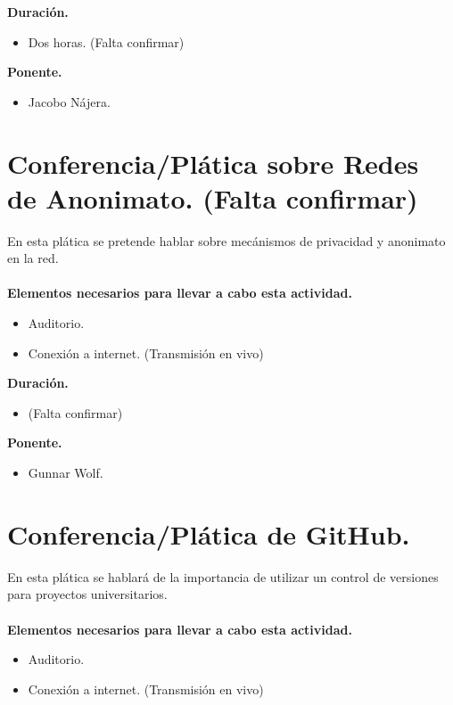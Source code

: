 \documentclass[a4paper,11pt]{article}                 %
\begin{document}
  \textbf{Duración.}
  \begin{itemize}
    \item Dos horas. (Falta confirmar)
  \end{itemize}
  
    \textbf{Ponente.}
  \begin{itemize}
    \item Jacobo Nájera.
  \end{itemize}
  
           \section{Conferencia/Plática sobre Redes de Anonimato. (Falta confirmar)}                                     %

   En esta plática se pretende hablar sobre mecánismos de privacidad y anonimato en la red.
      \paragraph{}
  \textbf{Elementos necesarios para llevar a cabo esta actividad.}
  \begin{itemize}
    \item Auditorio.
        \item Conexión a internet. (Transmisión en vivo)
  \end{itemize}
  
  \textbf{Duración.}
  \begin{itemize}
    \item (Falta confirmar)
  \end{itemize}
  
      \textbf{Ponente.}
  \begin{itemize}
    \item Gunnar Wolf.
  \end{itemize}
  
  \section{Conferencia/Plática de GitHub.}                                     %

   En esta plática se hablará de la importancia de utilizar un control de versiones para proyectos universitarios.
      \paragraph{}
  \textbf{Elementos necesarios para llevar a cabo esta actividad.}
  \begin{itemize}
    \item Auditorio.
        \item Conexión a internet. (Transmisión en vivo)
  \end{itemize}
  
\end{document}
